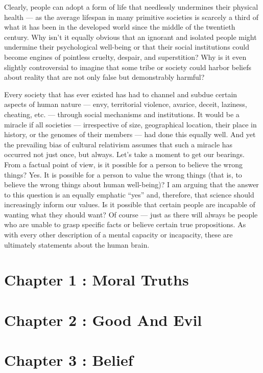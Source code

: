 \documentclass[a4paper,12pt]{extbook}
\begin{document}
Clearly, people can adopt a form of life that needlessly undermines their physical health --- as the average lifespan in many primitive societies is scarcely a third of what it has been in the developed world since the middle of the twentieth century. 
Why isn’t it equally obvious that an ignorant and isolated people might undermine their psychological well-being or that their social institutions could become engines of pointless cruelty, despair, and superstition? 
Why is it even slightly controversial to imagine that some tribe or society could harbor beliefs about reality that are not only false but demonstrably harmful? 

Every society that has ever existed has had to channel and subdue certain aspects of human nature --- envy, territorial violence, avarice, deceit, laziness, cheating, etc. --- through social mechanisms and institutions. 
It would be a miracle if all societies --- irrespective of size, geographical location, their place in history, or the genomes of their members --- had done this equally well. 
And yet the prevailing bias of cultural relativism assumes that such a miracle has occurred not just once, but always. 
Let’s take a moment to get our bearings. 
From a factual point of view, is it possible for a person to believe the wrong things? 
Yes. 
It is possible for a person to value the wrong things (that is, to believe the wrong things about human well-being)? 
I am arguing that the answer to this question is an equally emphatic ``yes'' and, therefore, that science should increasingly inform our values. 
Is it possible that certain people are incapable of wanting what they should want? 
Of course --- just as there will always be people who are unable to grasp specific facts or believe certain true propositions. 
As with every other description of a mental capacity or incapacity, these are ultimately statements about the human brain. 

\newpage
\section{Chapter 1 : Moral Truths}

\newpage
\section{Chapter 2 : Good And Evil}

\newpage
\section{Chapter 3 : Belief}
\end{document}
